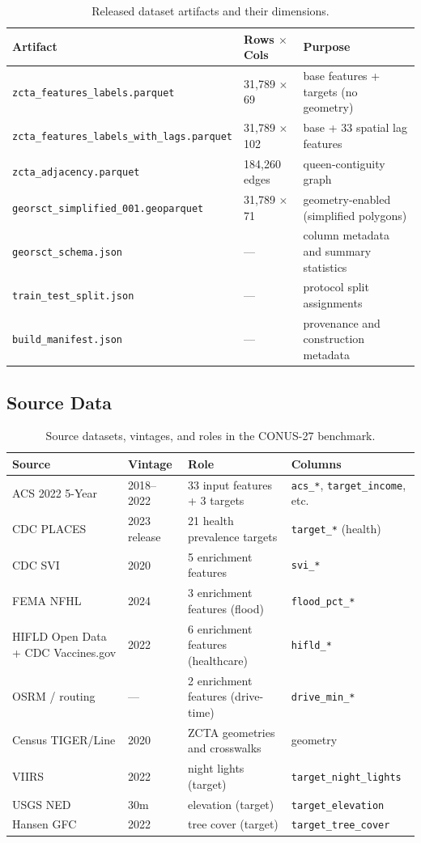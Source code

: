 \documentclass{article}
\begin{document}
\begin{table}[htbp]
\centering
\small
\caption{Released dataset artifacts and their dimensions.}
\label{tab:released_artifacts}
\begin{tabular}{lll}
\toprule
\textbf{Artifact} & \textbf{Rows $\times$ Cols} & \textbf{Purpose} \\
\midrule
\texttt{zcta\_features\_labels.parquet} & 31,789 $\times$ 69 & base features + targets (no geometry) \\
\texttt{zcta\_features\_labels\_with\_lags.parquet} & 31,789 $\times$ 102 & base + 33 spatial lag features \\
\texttt{zcta\_adjacency.parquet} & 184,260 edges & queen-contiguity graph \\
\texttt{georsct\_simplified\_001.geoparquet} & 31,789 $\times$ 71 & geometry-enabled (simplified polygons) \\
\texttt{georsct\_schema.json} & --- & column metadata and summary statistics \\
\texttt{train\_test\_split.json} & --- & protocol split assignments \\
\texttt{build\_manifest.json} & --- & provenance and construction metadata \\
\bottomrule
\end{tabular}
\end{table}

\subsection{Source Data}

\begin{table}[htbp]
\centering
\small
\caption{Source datasets, vintages, and roles in the CONUS-27 benchmark.}
\label{tab:source_data}
\begin{tabular}{llll}
\toprule
\textbf{Source} & \textbf{Vintage} & \textbf{Role} & \textbf{Columns} \\
\midrule
ACS 2022 5-Year & 2018--2022 & 33 input features + 3 targets & \texttt{acs\_*}, \texttt{target\_income}, etc. \\
CDC PLACES & 2023 release & 21 health prevalence targets & \texttt{target\_*} (health) \\
CDC SVI & 2020 & 5 enrichment features & \texttt{svi\_*} \\
FEMA NFHL & 2024 & 3 enrichment features (flood) & \texttt{flood\_pct\_*} \\
HIFLD Open Data + CDC Vaccines.gov & 2022 & 6 enrichment features (healthcare) & \texttt{hifld\_*} \\
OSRM / routing & --- & 2 enrichment features (drive-time) & \texttt{drive\_min\_*} \\
Census TIGER/Line & 2020 & ZCTA geometries and crosswalks & geometry \\
VIIRS & 2022 & night lights (target) & \texttt{target\_night\_lights} \\
USGS NED & 30m & elevation (target) & \texttt{target\_elevation} \\
Hansen GFC & 2022 & tree cover (target) & \texttt{target\_tree\_cover} \\
\bottomrule
\end{tabular}
\end{table}
\end{document}
